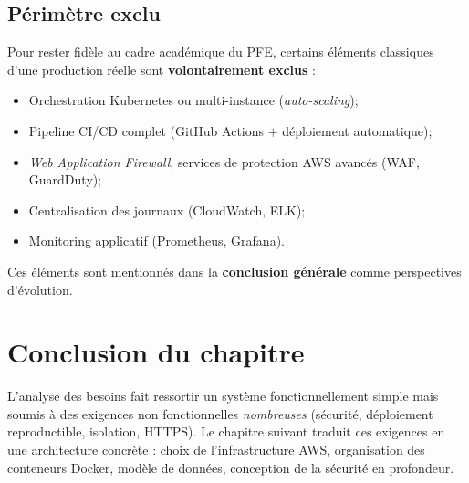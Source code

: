 \subsection{Périmètre exclu}

Pour rester fidèle au cadre académique du PFE, certains éléments
classiques d'une production réelle sont \textbf{volontairement exclus} :

\begin{itemize}
  \item Orchestration Kubernetes ou multi-instance (\emph{auto-scaling});
  \item Pipeline CI/CD complet (GitHub Actions \(+\) déploiement
        automatique);
  \item \emph{Web Application Firewall}, services de protection AWS
        avancés (WAF, GuardDuty);
  \item Centralisation des journaux (CloudWatch, ELK);
  \item Monitoring applicatif (Prometheus, Grafana).
\end{itemize}

Ces éléments sont mentionnés dans la \textbf{conclusion générale}
comme perspectives d'évolution.

\section{Conclusion du chapitre}

L'analyse des besoins fait ressortir un système fonctionnellement
simple mais soumis à des exigences non fonctionnelles
\emph{nombreuses} (sécurité, déploiement reproductible, isolation,
HTTPS). Le chapitre suivant traduit ces exigences en une architecture
concrète : choix de l'infrastructure AWS, organisation des conteneurs
Docker, modèle de données, conception de la sécurité en profondeur.
